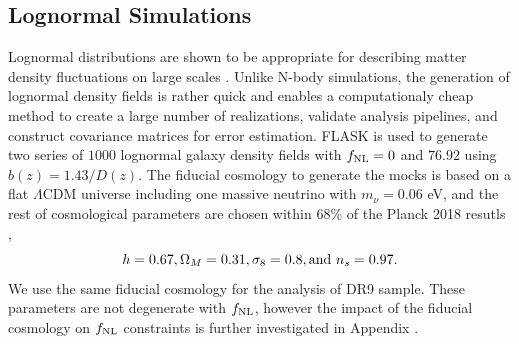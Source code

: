 \subsection{Lognormal Simulations}
Lognormal distributions are shown to be appropriate for describing matter density fluctuations on large scales \citep{coles1991}. Unlike N-body simulations, the generation of lognormal density fields is rather quick and enables a computationaly cheap method to create a large number of realizations, validate analysis pipelines, and construct covariance matrices for error estimation. \textsc{FLASK}  \citep[Full-sky Lognormal Astro-fields Simulation Kit;][]{Xavier_2016} is used to generate two series of $1000$ lognormal galaxy density fields with $f_{\rm NL}=0$ and $76.92$ using $b(z)=1.43/D(z)$. The fiducial cosmology to generate the mocks is based on a flat $\Lambda$CDM universe including one massive neutrino with $m_{\nu}=0.06$ eV, and the rest of cosmological parameters are chosen within $68\%$ of the Planck 2018 resutls ,
\begin{equation*}
    h = 0.67,  \Omega_{M}=0.31, \sigma_{8}=0.8, {\rm and}~ n_{s}=0.97.
\end{equation*}
We use the same fiducial cosmology for the analysis of DR9 sample. These parameters are not degenerate with $f_{\rm NL}$, however the impact of the fiducial cosmology on $f_{\rm NL}$ constraints is further investigated in Appendix .